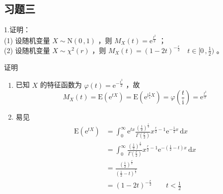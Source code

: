 \documentclass[12pt,hyperref,]{ctexart}
\begin{document}
\newpage

\heiti

\hypertarget{section-3}{%
\subsection{习题三}\label{section-3}}

\kaishu

1.证明：\\
(1) 设随机变量 \(X\sim \mathrm{N}(0\, ,1)\) ，则
\(M_X(t)=\mathrm{e}^{\frac{t^2}{2}}\) ；\\
(2) 设随机变量 \(X\sim \chi^2(r)\) ，则
\(M_X(t)=(1-2t)^{-\frac{r}{2}} \quad t\in[0\, ,\frac{1}{2})\) 。

\vspace{1em}

\heiti

证明

\songti

\begin{enumerate}
\def\labelenumi{(\arabic{enumi})}
\item
  已知 \(X\) 的特征函数为 \(\varphi(t)=\mathrm{e}^{-\frac{t^2}{2}}\)
  ，故 \begin{equation*}
  M_X(t)=\mathrm{E}\left(\mathrm{e}^{tX}\right)=\mathrm{E}\left(\mathrm{e}^{\mathrm{i}\frac{t}{\mathrm{i}}X}\right)=\varphi\left(\frac{t}{\mathrm{i}}\right)=\mathrm{e}^{\frac{t^2}{2}}
  \end{equation*}
\item
  易见 \begin{equation*}
  \begin{aligned}
  \mathrm{E}\left(\mathrm{e}^{tX}\right)&=\int_{0}^{\infty}\mathrm{e}^{tx}\frac{\left(\frac 12\right)^{\frac r2}}{\Gamma\left(\frac r2\right)}x^{\frac r2-1}\mathrm{e}^{-\frac 12 x}\, \mathrm{d}x \\
  &=\int_{0}^{\infty}\frac{\left(\frac 12\right)^{\frac r2}}{\Gamma\left(\frac r2\right)}x^{\frac r2-1}\mathrm{e}^{-\left(\frac 12-t\right) x}\, \mathrm{d}x \\
  &=\frac{\left(\frac 12\right)^{\frac r2}}{\left(\frac 12-t\right)^{\frac r2}} \\
  &=(1-2t)^{-\frac{r}{2}} \qquad t< \frac{1}{2}
  \end{aligned}
  \end{equation*}
\end{enumerate}

\vspace{3em}

\kaishu
\end{document}
